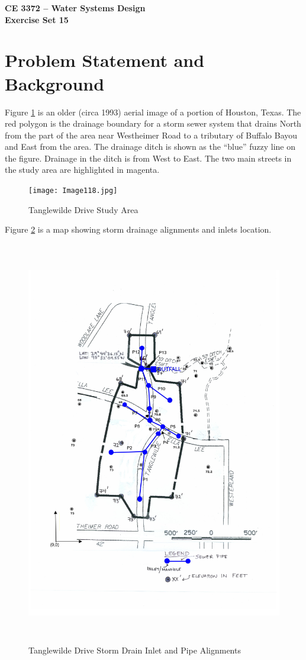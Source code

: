 \documentclass[12pt]{article}
\begin{document}
\begin{center}
{\textbf{{ CE 3372 -- Water Systems Design} \\ {Exercise Set 15}}}
\end{center}

\section*{\small{Problem Statement and Background}}
Figure \ref{fig:aerial} is an older (circa 1993) aerial image of a portion of Houston, Texas.   
The red polygon is the drainage boundary for a storm sewer system that drains North from the part of the area near Westheimer Road to a tributary of Buffalo Bayou and East from the area.
The drainage ditch is shown as the ``blue''   fuzzy line on the figure.  
Drainage in the ditch is from West to East.
The two main streets in the study area are highlighted in magenta.  
\begin{figure}[h!] %
   \centering
   \texttt{[image: Image118.jpg]} 
   \caption{Tanglewilde Drive Study Area}
   \label{fig:aerial}
\end{figure}
\clearpage

Figure \ref{fig:survey} is a map showing storm drainage alignments and inlets location.  
\begin{figure}[h!] %
   \centering
   \includegraphics[height=7in]{Image119B.jpg} 
   \caption{Tanglewilde Drive Storm Drain Inlet and Pipe Alignments}
   \label{fig:survey}
\end{figure}
\end{document}
